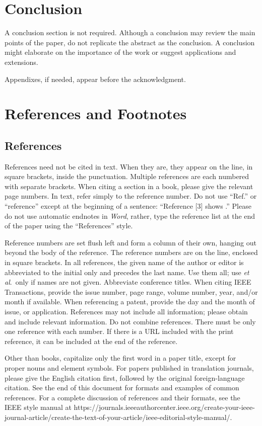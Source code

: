 \documentclass[journal,twoside,web]{ieeecolor}
\begin{document}
\section{Conclusion}
A conclusion section is not required. Although a conclusion may review the 
main points of the paper, do not replicate the abstract as the conclusion. A 
conclusion might elaborate on the importance of the work or suggest 
applications and extensions. 

\appendices

Appendixes, if needed, appear before the acknowledgment.

\section*{References and Footnotes}

\subsection{References}
References need not be cited in text. When they are, they appear on the
line, in square brackets, inside the punctuation. Multiple references are
each numbered with separate brackets. When citing a section in a book,
please give the relevant page numbers. In text, refer simply to the
reference number. Do not use ``Ref.'' or ``reference'' except at the
beginning of a sentence: ``Reference [3] shows \textellipsis .'' Please do not use
automatic endnotes in \textit{Word}, rather, type the reference list at the end of the
paper using the ``References'' style.

Reference numbers are set flush left and form a column of their own, hanging
out beyond the body of the reference. The reference numbers are on the line,
enclosed in square brackets. In all references, the given name of the author
or editor is abbreviated to the initial only and precedes the last name. Use
them all; use \textit{et al}.\ only if names are not given.
Abbreviate conference titles. When citing IEEE Transactions,
provide the issue number, page range, volume number, year, and/or month if
available. When referencing a patent, provide the day and the month of
issue, or application. References may not include all information; please
obtain and include relevant information. Do not combine references. There
must be only one reference with each number. If there is a URL included with
the print reference, it can be included at the end of the reference.

Other than books, capitalize only the first word in a paper title, except
for proper nouns and element symbols. For papers published in translation
journals, please give the English citation first, followed by the original
foreign-language citation. See the end of this document for formats and
examples of common references. For a complete discussion of references and
their formats, see the IEEE style manual at 
https://\discretionary{}{}{}journals.ieeeauthorcenter.ieee.org/\discretionary{}{}{}create-your-ieee-journal-article/\discretionary{}{}{}create-the-text-of-your-article/\discretionary{}{}{}ieee-editorial-style-manual/.
\end{document}
